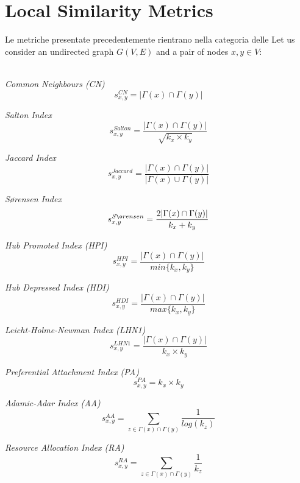 \section{Local Similarity Metrics}
\label{sec:metrics}
Le metriche presentate precedentemente rientrano nella categoria delle 
Let us consider an undirected graph $G(V,E)$ and a pair of nodes $x,y\in V$:

\noindent\\
\textit{Common Neighbours (CN)}
\begin{equation}
\label{eqn:common-neighbours}
s^{CN}_{x,y}= |\Gamma(x) \cap \Gamma(y)|
\end{equation}

\noindent
\textit{Salton Index}
\begin{equation}
\label{eqn:salton}
s^{Salton}_{x,y}=
\frac{ |\Gamma(x) \cap \Gamma(y)|}{\sqrt{k_{x} \times k_{y}}}
\end{equation}

\noindent
\textit{Jaccard Index}
\begin{equation}
\label{eqn:jaccard}
s^{Jaccard}_{x,y}=
\frac{|\Gamma(x) \cap \Gamma(y)|}{|\Gamma(x) \cup \Gamma(y)|}
\end{equation}

\noindent
\textit{S\o rensen Index}
\begin{equation}
\label{eqn:sorensen}
s^{S\o rensen}_{x,y}=
\frac{2|\Gamma(x) \cap \Gamma(y)|}{k_{x} + k_{y}}
\end{equation}

\noindent
\textit{Hub Promoted Index (HPI)}
\begin{equation}
\label{eqn:hpi}
s^{HPI}_{x,y}=
\frac{|\Gamma(x) \cap \Gamma(y)|}{min\{k_{x},k_{y}\}}
\end{equation}

\noindent
\textit{Hub Depressed Index (HDI)}
\begin{equation}
\label{eqn:hdi}
s^{HDI}_{x,y}=
\frac{|\Gamma(x) \cap \Gamma(y)|}{max\{k_{x},k_{y}\}}
\end{equation}

\noindent
\textit{Leicht-Holme-Newman Index (LHN1)}
\begin{equation}
\label{eqn:lhn1}
s^{LHN1}_{x,y}=
\frac{|\Gamma(x) \cap \Gamma(y)|}{k_{x} \times k_{y}}
\end{equation}

\noindent
\textit{Preferential Attachment Index (PA)}
\begin{equation}
\label{eqn:pa}
s^{PA}_{x,y}= k_{x} \times k_{y}
\end{equation}

\noindent
\textit{Adamic-Adar Index (AA)}
\begin{equation}
\label{eqn:adamic-adar}
s^{AA}_{x,y}=
\sum\limits_{z\in \Gamma(x) \cap \Gamma(y)}\frac{1}{log(k_{z})}
\end{equation}

\noindent
\textit{Resource Allocation Index (RA)}
\begin{equation}
\label{eqn:resource-allocation}
s^{RA}_{x,y}=
\sum\limits_{z\in \Gamma(x) \cap \Gamma(y)}\frac{1}{k_{z}}
\end{equation}



